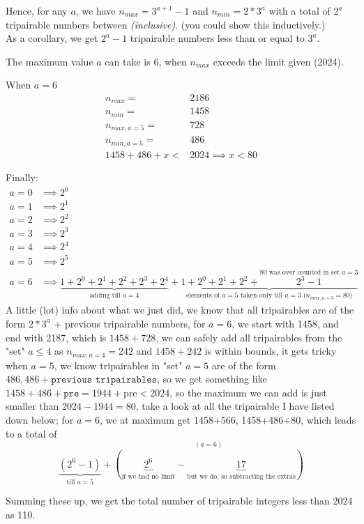 \documentclass[12pt, letterpaper]{article}
\begin{document}
Hence, for any $a$, we have $n_{max} = 3^{a+1}-1$ and $n_{min}=2*3^a$ with a total of $2^a$ tripairable numbers between \textit{(inclusive)}. (you could show this inductively.)\\
As a corollary, we get $2^a-1$ tripairable numbers less than or equal to $3^a$.

The maximum value $a$ can take is 6, when $n_{max}$ exceeds the limit given (2024).

When $a=6$
\begin{align}
n_{max}=&2186 \\
n_{min} =& 1458 \\
n_{max, a=5} =& 728\\
n_{min, a=5} =& 486\\
1458+486+x<&2024 \implies x < 80
\end{align}

Finally:
\begin{align*}
    a=0 &\implies 2^0 \\
    a=1 &\implies 2^1 \\
    a=2 &\implies 2^2 \\
    a=3 &\implies 2^3 \\
    a=4 &\implies 2^4 \\
    a=5 &\implies 2^5 \\
    a=6 &\implies \underbrace{1+2^0+2^1+2^2+2^3+2^4}_{\text{adding till }a=4}+\underbrace{1+2^0+2^1+2^2+\overset{80 \text{ was over counted in set }a=3}{2^3-1}}_{\text{elements of }a=5\text{ taken only till }a=3\text{ ($n_{max,a=3}=80$)}}
\end{align*}
A little (lot) info about what we just did, we know that all tripairables are of the form $2*3^a$ + previous tripairable numbers, for $a=6$, we start with 1458, and end with 2187, which is $1458+728$, we can safely add all tripairables from the "set" $a\leq4$ as $n_{max, a=4}=242$ and $1458+242$ is within bounds, it gets tricky when $a=5$, we know tripairables in "set" $a=5$ are of the form $486, 486+\texttt{previous tripairables}$, so we get something like $1458+486+\texttt{pre}=1944+\text{pre}<2024$, so the maximum we can add is just smaller than $2024-1944=80$, take a look at all the tripairable I have listed down below; for $a=6$, we at maximum get 1458+566, 1458+486+80, which leads to a total of $$\underbrace{(2^6-1)}_{\text{till }a=5}+\overset{(a=6)}{(\underbrace{2^6}_{\text{if we had no limit}}-\underbrace{17}_{\text{but we do, so subtracting the extras}})}$$

Summing these up, we get the total number of tripairable integers less than 2024 as \colorbox{Apricot}{110}.
\end{document}

